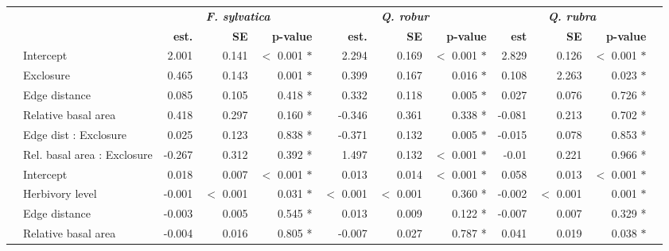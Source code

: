 \documentclass[10pt, twoside]{book} %
\begin{document}
\begin{landscape}
\begin{table}
\begin{center}
\begin{footnotesize}
\begin{tabular}{p{0.2cm} p{2cm} r r r r r r r r r p{0.001cm}}
				\cmidrule{1-11}
				& & \multicolumn{3}{c}{\textbf{\textit{F. sylvatica}}} & \multicolumn{3}{c}{\textbf{\textit{Q. robur}}} & \multicolumn{3}{c}{\textbf{\textit{Q. rubra}}} &\\
				\cmidrule(r){3-5}
				\cmidrule(r){6-8}
				\cmidrule(r){9-11}
				& & \textbf{est.} & \textbf{SE} & \textbf{p-value} & \textbf{est.} & \textbf{SE} & \textbf{p-value} & \textbf{est} & \textbf{SE} & \textbf{p-value} &\\
				\multirow{6}{*}{\rotatebox[origin=c]{90}{\parbox[c]{3cm}{\centering \textbf{Herbivory level}}}} & Intercept & 2.001 &0.141&$<$ 0.001 $\ast$& 2.294& 0.169 & $<$ 0.001 $\ast$ & 2.829 & 0.126 & $<$ 0.001 $\ast$& \\
				& Exclosure &0.465 & 0.143 & 0.001 $\ast$ & 0.399 &0.167 & 0.016 $\ast$ & 0.108 & 2.263 & 0.023 $\ast$&\\
				& Edge distance &0.085 & 0.105 & 0.418 \color{white}*\color{black} & 0.332 & 0.118 & 0.005 $\ast$ & 0.027 & 0.076 & 0.726 \color{white}*\color{black} &\\
				& Relative basal area &0.418 & 0.297 & 0.160 \color{white}*\color{black} & -0.346 & 0.361 & 0.338 \color{white}*\color{black} & -0.081 & 0.213 & 0.702 \color{white}*\color{black} &\\
				& Edge dist : Exclosure &0.025 & 0.123 & 0.838 \color{white}*\color{black} & -0.371 & 0.132 & 0.005 $\ast$ & -0.015 & 0.078 & 0.853 \color{white}*\color{black} &\\
				& Rel. basal area : Exclosure &-0.267 & 0.312 & 0.392 \color{white}*\color{black} & 1.497 & 0.132 & $<$ 0.001 $\ast$ & -0.01 & 0.221 & 0.966 \color{white}*\color{black} &\\
				\cmidrule{3-11}
				\multirow{4}{*}{\rotatebox[origin=c]{90}{\parbox[c]{2.2cm}{\centering \textbf{Sapling growth}}}} & Intercept &0.018 & 0.007 & $<$ 0.001 $\ast$ & 0.013 & 0.014 & $<$ 0.001 $\ast$ & 0.058 & 0.013 & $<$ 0.001 $\ast$ &\\
				& Herbivory level &-0.001 & $<$ 0.001 & 0.031 $\ast$ & $<$ 0.001 & $<$ 0.001 & 0.360 \color{white}*\color{black} & -0.002 & $<$ 0.001 & 0.001 $\ast$&\\
				& Edge distance &-0.003 & 0.005 & 0.545 \color{white}*\color{black} & 0.013 & 0.009 & 0.122 \color{white}*\color{black} & -0.007 & 0.007 & 0.329 \color{white}*\color{black} &\\
				& Relative basal area &-0.004 & 0.016 & 0.805 \color{white}*\color{black} &  -0.007 & 0.027 & 0.787 \color{white}*\color{black} &  0.041 & 0.019 & 0.038 $\ast$&\\
				\cmidrule{1-11}
			\end{tabular}\endgroup
		\end{footnotesize}
	\end{center}
\end{table}
\end{landscape}
\clearpage	
\end{document}
